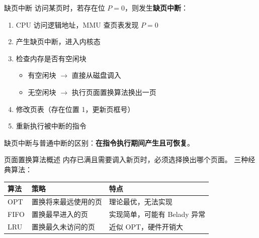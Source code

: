 \documentclass[10pt, aspectratio=169]{beamer}
\begin{document}
\begin{frame}{缺页中断}
    访问某页时，若存在位 $P=0$，则发生\textbf{缺页中断}：
    \vspace{0.5em}
    \begin{enumerate}
        \item CPU 访问逻辑地址，MMU 查页表发现 $P=0$
        \item 产生缺页中断，进入内核态
        \item 检查内存是否有空闲块
            \begin{itemize}
                \item 有空闲块 $\rightarrow$ 直接从磁盘调入
                \item 无空闲块 $\rightarrow$ 执行页面置换算法换出一页
            \end{itemize}
        \item 修改页表（存在位置 1，更新页框号）
        \item 重新执行被中断的指令
    \end{enumerate}
    \vspace{0.5em}
    缺页中断与普通中断的区别：\textbf{在指令执行期间产生且可恢复}。
\end{frame}

\begin{frame}{页面置换算法概述}
    内存已满且需要调入新页时，必须选择换出哪个页面。
    \vspace{0.5em}
    三种经典算法：
    \begin{center}
        \begin{tabular}{|l|l|l|}
            \hline
            \textbf{算法} & \textbf{策略} & \textbf{特点} \\
            \hline
            OPT & 置换将来最远使用的页 & 理论最优，无法实现 \\
            FIFO & 置换最早进入的页 & 实现简单，可能有 Belady 异常 \\
            LRU & 置换最久未访问的页 & 近似 OPT，硬件开销大 \\
            \hline
        \end{tabular}
    \end{center}
\end{frame}
\end{document}
